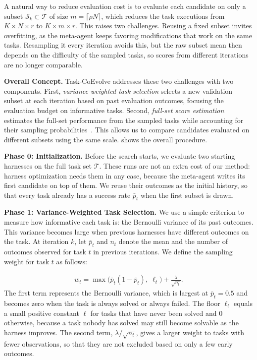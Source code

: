 \documentclass{article} %
\begin{document}
A natural way to reduce evaluation cost is to evaluate each candidate on only a subset $\mathcal{S}_k \subset \mathcal{T}$ of size $m = \lceil \rho N \rceil$, which reduces the task executions from $K \times N \times r$ to $K \times m \times r$. This raises two challenges. Reusing a fixed subset invites overfitting, as the meta-agent keeps favoring modifications that work on the same tasks. Resampling it every iteration avoids this, but the raw subset mean then depends on the difficulty of the sampled tasks, so scores from different iterations are no longer comparable.

\textbf{Overall Concept.}
Task-CoEvolve addresses these two challenges with two components. First, \emph{variance-weighted task selection} selects a new validation subset at each iteration based on past evaluation outcomes, focusing the evaluation budget on informative tasks. Second, \emph{full-set score estimation} estimates the full-set performance from the sampled tasks while accounting for their sampling probabilities~\citep{Horvitz01121952}. This allows us to compare candidates evaluated on different subsets using the same scale.  shows the overall procedure.

\textbf{Phase 0: Initialization.}
Before the search starts, we evaluate two starting harnesses on the full task set $\mathcal{T}$. These runs are not an extra cost of our method: harness optimization needs them in any case, because the meta-agent writes its first candidate on top of them. We reuse their outcomes as the initial history, so that every task already has a success rate $\bar{p}_t$ when the first subset is drawn.

\textbf{Phase 1: Variance-Weighted Task Selection.}
We use a simple criterion to measure how informative each task is: the Bernoulli variance of its past outcomes. This variance becomes large when previous harnesses have different outcomes on the task. At iteration $k$, let $\bar{p}_t$ and $n_t$ denote the mean and the number of outcomes observed for task $t$ in previous iterations. We define the sampling weight for task $t$ as follows:

\begin{equation}
\begin{aligned}
w_t = \max\bigl( \bar{p}_t (1 - \bar{p}_t),\; \ell_t \bigr) + \frac{\lambda}{\sqrt{n_t}}.
\end{aligned}
\label{eq:vws_weight}
\end{equation}
The first term represents the Bernoulli variance, which is largest at $\bar{p}_t=0.5$ and becomes zero when the task is always solved or always failed. The floor $\ell_t$ equals a small positive constant $\ell$ for tasks that have never been solved and $0$ otherwise, because a task nobody has solved may still become solvable as the harness improves. The second term, $\lambda/\sqrt{n_t}$, gives a larger weight to tasks with fewer observations, so that they are not excluded based on only a few early outcomes.
\end{document}
